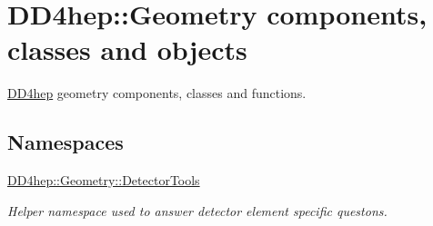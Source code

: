 \hypertarget{group___d_d4_h_e_p___g_e_o_m_e_t_r_y}{}\section{D\+D4hep\+:\+:Geometry components, classes and objects}
\label{group___d_d4_h_e_p___g_e_o_m_e_t_r_y}


\hyperlink{namespace_d_d4hep}{D\+D4hep} geometry components, classes and functions.  


\subsection*{Namespaces}
\begin{DoxyCompactItemize}
\item 
 \hyperlink{namespace_d_d4hep_1_1_geometry_1_1_detector_tools}{D\+D4hep\+::\+Geometry\+::\+Detector\+Tools}
\begin{DoxyCompactList}\small\item\em Helper namespace used to answer detector element specific questons. \end{DoxyCompactList}\end{DoxyCompactItemize}
